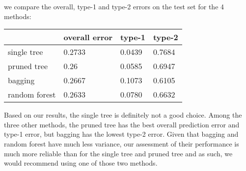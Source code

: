 \documentclass[11pt]{article}
\begin{document}
\begin{enumerate}
   we compare the overall, type-1 and type-2 errors on the test set for the 4 methods:
  
  \begin{tabular}{llll}
  \hline
   & overall error & type-1 & type-2  \\
  \hline 
  single tree & 0.2733 & 0.0439 & 0.7684  \\
pruned tree &    0.26 & 0.0585 & 0.6947 \\
  bagging & 0.2667 & 0.1073 & 0.6105 \\
    random forest &0.2633 & 0.0780 & 0.6632 \\
  \hline
  \end{tabular}
  
  Based on our results, 
  the single tree is definitely not a good choice. Among the three other methods, the pruned tree has the best overall prediction error and type-1 error, but bagging has the lowest type-2 error.
  Given that bagging and random forest have much less variance, our assessment of their performance is much more reliable than for the single tree and pruned tree and as such, we would recommend using one of those two methods.
  
  \end{enumerate}
\end{document}
